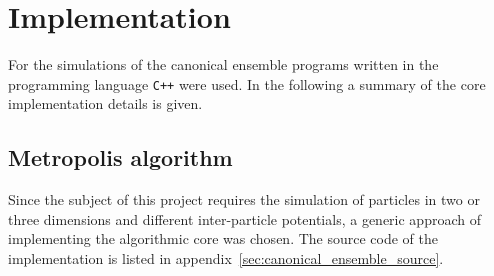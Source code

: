 \documentclass[11pt, a4paper]{article}
\numberwithin{equation}{section}
\begin{document}
\section{Implementation} \label{sec:implementation}
For the simulations of the canonical ensemble programs written in the programming language \texttt{C++} were used.
In the following a summary of the core implementation details is given.

\subsection{Metropolis algorithm} \label{sec:Metropolis_alg}
Since the subject of this project requires the simulation of particles in two or three dimensions and different inter-particle potentials, a generic approach of implementing the algorithmic core was chosen.
The source code of the implementation is listed in appendix~\ref{sec:canonical_ensemble_source}.
\end{document}
